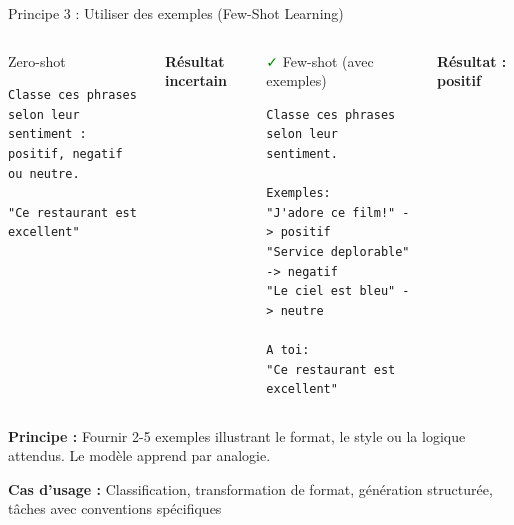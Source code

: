 \begin{frame}[fragile]{Principe 3 : Utiliser des exemples (Few-Shot Learning)}
\begin{columns}
\begin{alertblock}{\textcolor{red}{\faTimes} Zero-shot}
\begin{lstlisting}[basicstyle=\ttfamily\tiny]
Classe ces phrases selon leur 
sentiment : positif, negatif 
ou neutre.

"Ce restaurant est excellent"
\end{lstlisting}
\end{alertblock}

\textbf{Résultat incertain}

\begin{exampleblock}{\textcolor{green}{\faCheck} Few-shot (avec exemples)}
\begin{lstlisting}[basicstyle=\ttfamily\tiny]
Classe ces phrases selon leur 
sentiment.

Exemples:
"J'adore ce film!" -> positif
"Service deplorable" -> negatif  
"Le ciel est bleu" -> neutre

A toi:
"Ce restaurant est excellent"
\end{lstlisting}
\end{exampleblock}

\textbf{Résultat : positif} \checkmark
\end{columns}

\vspace{0.3cm}

{\footnotesize
    \textbf{Principe :}
    \medskip
    Fournir 2-5 exemples illustrant le format, le style ou la logique attendus. Le modèle apprend par analogie.

    \textbf{Cas d'usage :} Classification, transformation de format, génération structurée, tâches avec conventions spécifiques
}
\end{frame}

